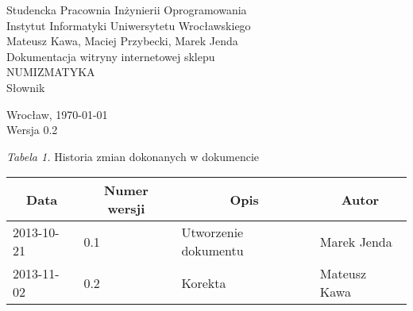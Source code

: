 \documentclass [11pt, a4paper, leqno]	{article}	%
\begin{document}

\begin{center}
	\thispagestyle{empty} 							%
	{\large Studencka Pracownia Inżynierii Oprogramowania} 		\\ [0.5cm]
	{\large Instytut Informatyki Uniwersytetu Wrocławskiego} 	\\ [6.0cm]

	{\large Mateusz Kawa, Maciej Przybecki, Marek Jenda} 		\\ [1.5cm]

	{\huge Dokumentacja witryny internetowej sklepu} 			\\ [0.5cm]
	{\huge NUMIZMATYKA} 										\\ [1.5cm]

	{\large Słownik} 										 	\\ [0.5cm]

	\vfill
	
	{\large Wrocław, \today}									\\ [0.5cm]
	{\large Wersja 0.2}
\end{center}

\newpage


\textit{Tabela 1.} Historia zmian dokonanych w dokumencie

\begin{center}
	\begin{tabular}{| l | l | l | l |}
		\hline
		\multicolumn{1}{|c|}{Data} & 
		\multicolumn{1}{|c|}{Numer wersji} &  
		\multicolumn{1}{|c|}{Opis} &
		\multicolumn{1}{|c|}{Autor} \\ \hline \hline
		2013-10-21 & 0.1 & Utworzenie dokumentu & Marek Jenda \\ \hline
		2013-11-02 & 0.2 & Korekta & Mateusz Kawa \\ \hline
	\end{tabular}
\end{center}
\newpage
\end{document}
